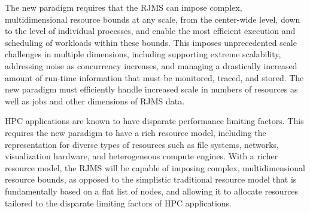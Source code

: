 

The new paradigm requires that the RJMS can impose
complex, multidimensional resource bounds at any scale, 
from the center-wide level, down to the level of individual processes,
and enable the most efficient execution and
scheduling of workloads within these bounds.
This imposes unprecedented scale challenges
in multiple dimensions, including
supporting extreme scalability, addressing noise as concurrency
increases, and managing a drastically increased amount of
run-time information that must be monitored, traced, and stored.
The new paradigm must efficiently handle increased scale in
numbers of resources as well as jobs and other dimensions 
of RJMS data.

HPC applications are known to have disparate performance 
limiting factors. This requires
the new paradigm to have a rich resource model, including
the 
representation for diverse
types of resources such as file systems, networks, visualization
hardware, and heterogeneous compute engines.
With a richer resource model, the RJMS will be capable of imposing
complex, multidimensional resource bounds, as opposed to the
simplistic traditional resource model that is fundamentally based on a
flat list of nodes, and allowing it to 
allocate resources tailored to the disparate limiting
factors of HPC applications.  


